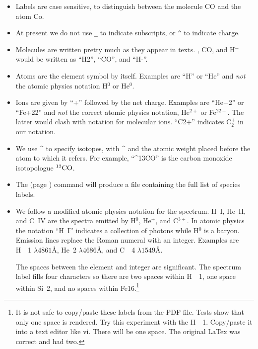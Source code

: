 \begin{itemize}

 \item
 Labels are case sensitive, to distinguish between the
 molecule CO and the atom Co.
 
 \item
 At present we do not use \verb|_| to indicate subscripts, or \verb|^|
 to indicate  charge.

 \item
 Molecules are written pretty much as they appear in texts.
 \htwo, CO, and H$^-$ would be written as ``H2'', ``CO'', and ``H-''.

 \item 
 Atoms are the element symbol by itself.
 Examples are ``H'' or ``He''
and \emph{not} the atomic physics notation
 H$^0$ or He$^0$.
 
 \item 
 Ions are given by ``+'' followed by the net charge.
 Examples are ``He+2'' or ``Fe+22''
 and \emph{not} the correct atomic physics notation,
 He$^{2+}$ or Fe$^{22+}$.
 The latter would clash with notation for molecular ions.
 ``C2+'' indicates C$_2^+$ in our notation.
 
\item We use \^{} to specify isotopes, with \^{} and the atomic weight
  placed before the atom to which it refers.  For example,
  ``\^{}13CO'' is the carbon monoxide isotopologue $\rm ^{13}CO$.
  
\item The  (page \pageref{sec:SaveSpeciesLabels}) 
command will produce a file containing the full list of species labels.

 \item
 We follow a modified atomic physics notation for the spectrum.
 H~I, He~II, and C~IV are the spectra emitted by H$^0$, He$^+$, and C$^{3+}$.
 In atomic physics the notation ``H~I'' indicates a collection of photons while H$^0$ is a baryon.  
 Emission lines replace the Roman numeral with an integer.
 Examples are H~~1 $\lambda 4861$\AA, 
 He~2  $\lambda 4686$\AA,
 and C~~4  $\lambda 1549$\AA.
 
 The spaces between the element and integer are significant.
 The spectrum label fills four characters so there are two spaces within
H~~1, one  space within Si~2, and no spaces within Fe16.\footnote{
It is not safe to copy/paste these labels from the PDF file.
Tests show that only one space is rendered.  Try this experiment
with the H~~1.  Copy/paste it into a text editor like vi.  There will be one space.
The original LaTex was correct and had two.}


\end{itemize}
